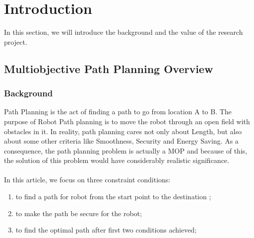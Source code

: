 \documentclass[a4paper, 11pt]{article}
\begin{document}

\tableofcontents
\newpage

\section{Introduction}
In this section, we will introduce the background and the value of the research project.\\
\subsection{Multiobjective Path Planning Overview}
\subsubsection{Background}
Path Planning is the act of finding a path to go from location A to B.
The purpose of Robot Path planning is to move the robot through an open field with obstacles in it.
In reality, path planning cares not only about Length, but also about some other criteria like Smoothness, Security and Energy Saving.
As a consequence, the path planning problem is actually a MOP and because of this, the solution of this problem would have
considerably realistic significance.\\
\\
In this article, we focus on three constraint conditions:
\begin{enumerate}[~~a.]
\item to find a path for robot from the start point to the destination ;
\item to make the path be secure for the robot;
\item to find the optimal path after first two conditions achieved;\newline
\end{enumerate}
\end{document}
